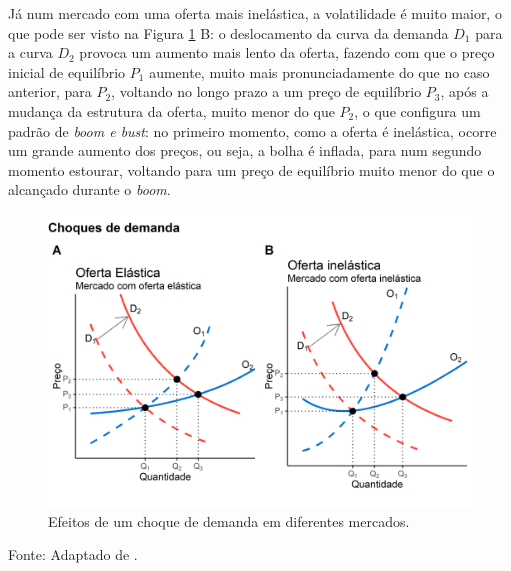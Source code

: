 \documentclass[
	12pt,				%
	oneside,			%
	a4paper,			%
	chapter=TITLE,		%
	section=TITLE,		%
	english,			%
	brazil				%
	]{abntex2}
\newcommand{\bcenter}{\begin{center}}
\newcommand{\ecenter}{\end{center}}
\begin{document}
Já num mercado com uma oferta mais inelástica, a volatilidade é muito maior, o
que pode ser visto na Figura \ref{fig:choque} B: o deslocamento da curva da
demanda \(D_1\) para a curva \(D_2\) provoca um aumento mais lento da oferta, fazendo
com que o preço inicial de equilíbrio \(P_1\) aumente, muito mais pronunciadamente
do que no caso anterior, para \(P_2\), voltando no longo prazo a um preço de
equilíbrio \(P_3\), após a mudança da estrutura da oferta, muito menor do que
\(P_2\), o que configura um padrão de \emph{boom e bust}: no primeiro momento, como a
oferta é inelástica, ocorre um grande aumento dos preços, ou seja, a bolha é
inflada, para num segundo momento estourar, voltando para um preço de equilíbrio
muito menor do que o alcançado durante o \emph{boom}.
\begin{figure}[H]

{\centering \includegraphics[width=1\linewidth]{images/choque-1} 

}

\caption{Efeitos de um choque de demanda em diferentes mercados.}\label{fig:choque}
\end{figure}
\bcenter

Fonte: Adaptado de \textcite[p.~19]{Malpezzi2002TheRO}.
\ecenter
\end{document}
